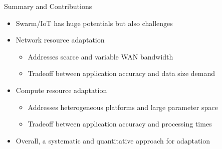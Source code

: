 \begin{frame}{Summary and Contributions}
  \begin{itemize}
    \pause
  \item Swarm/IoT has huge potentials but also challenges
    \pause
  \item Network resource adaptation
    \begin{itemize}
    \item Addresses scarce and variable WAN bandwidth
    \item Tradeoff between application accuracy and data size demand
    \end{itemize}

    \pause
  \item Compute resource adaptation
    \begin{itemize}
    \item Addresses heterogeneous platforms and large parameter space
    \item Tradeoff between application accuracy and processing times
    \end{itemize}

    \pause
  \item Overall, a systematic and quantitative approach for adaptation
  \end{itemize}
\end{frame}


